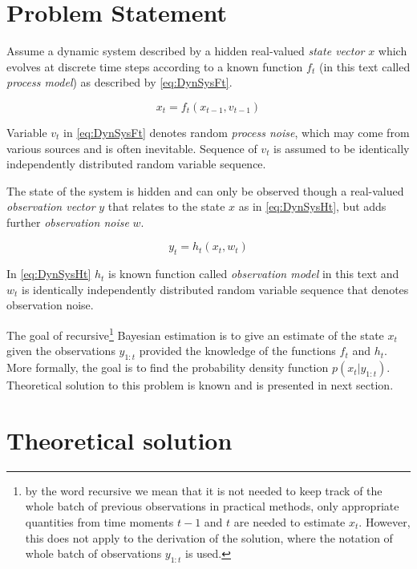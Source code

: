 \documentclass[a4paper,12pt,oneside]{report}
\newcommand{\pdf}{probability density function }
\begin{document}
\section{Problem Statement}

Assume a dynamic system described by a hidden real-valued \emph{state vector} \(x\) which evolves at
discrete time steps according to a known function \(f_t\) (in this text called \emph{process model})
as described by \eqref{eq:DynSysFt}.

\begin{equation} \label{eq:DynSysFt}
	x_t = f_t(x_{t-1}, v_{t-1})
\end{equation}

Variable \(v_t\) in \eqref{eq:DynSysFt} denotes random \emph{process noise}, which may come from various
sources and is often inevitable. Sequence of \(v_t\) is assumed to be identically independently
distributed random variable sequence.

The state of the system is hidden and can only be observed though a real-valued \emph{observation vector}
\(y\) that relates to the state \(x\) as in \eqref{eq:DynSysHt}, but adds further \emph{observation
noise} \(w\).

\begin{equation} \label{eq:DynSysHt}
	y_t = h_t(x_t, w_t)
\end{equation}

In \eqref{eq:DynSysHt} \(h_t\) is known function called \emph{observation model} in this text and \(w_t\) is
identically independently distributed random variable sequence that denotes observation noise.

The goal of recursive\footnote{by the word recursive we mean that it is not needed to keep track of
the whole batch of previous observations in practical methods, only appropriate quantities from time
moments \(t-1\) and \(t\) are needed to estimate \(x_t\). However, this does not apply to the
derivation of the solution, where the notation of whole batch of observations \(y_{1:t}\) is used.}
Bayesian estimation is to give an estimate of the state \(x_t\) given the
observations \(y_{1:t}\) provided the knowledge of the functions \(f_t\) and \(h_t\).
More formally, the goal is to find the \pdf \(p(x_t | y_{1:t})\).
Theoretical solution to this problem is known and is presented in next section.

\section{Theoretical solution}
\end{document}
